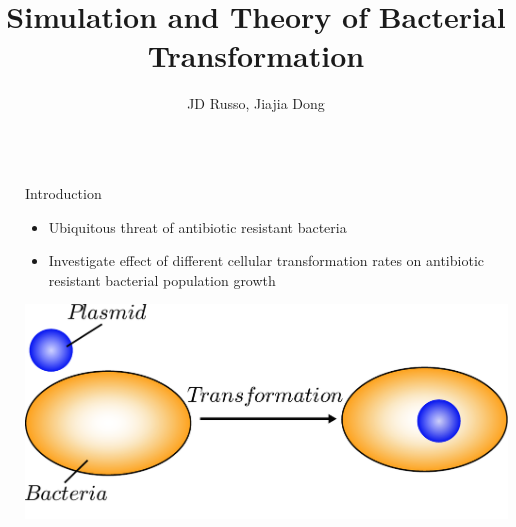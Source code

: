 \documentclass[final]{beamer}
\title{Simulation and Theory of Bacterial Transformation} %
\author{JD Russo, Jiajia Dong} %
\institute{Department of Physics and Astronomy, Bucknell University} %
\newlength{\onecolwid}
\newlength{\figwid}
\begin{document}

\setlength{\belowcaptionskip}{2ex} %
\setlength\belowdisplayshortskip{2ex} %




\begin{frame}[t] %

\begin{block}

\begin{columns}[t] %
\begin{column}{4ex}\end{column} %

\begin{column}{\onecolwid}

  \begin{alertblock}{Introduction}
  \begin{itemize}
    \item Ubiquitous threat of antibiotic resistant bacteria
    \item Investigate effect of different cellular transformation rates on antibiotic
    resistant bacterial population growth
  \end{itemize}

  \begin{center}
    \includegraphics[width=.8\figwid]{../dev/graphics/poster/transformation.pdf}
  \end{center}
  \end{alertblock}
\end{column}


\end{columns}
\end{block}
\end{frame}
\end{document}
